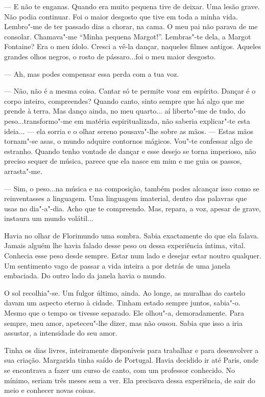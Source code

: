 --- E não te enganas. Quando era muito pequena tive de deixar. Uma lesão
grave. Não podia continuar. Foi o maior desgosto que tive em toda a
minha vida. Lembro"-me de ter passado dias a chorar, na cama. O meu pai
não parava de me consolar. Chamava"-me ``Minha pequena Margot!''.
Lembras"-te dela, a Margot Fontaine? Era o meu ídolo. Cresci a vê-la
dançar, naqueles filmes antigos. Aqueles grandes olhos negros, o rosto
de pássaro...foi o meu maior desgosto.

--- Ah, mas podes compensar essa perda com a tua voz.

--- Não, não é a mesma coisa. Cantar só te permite voar em espírito.
Dançar é o corpo inteiro, compreendes? Quando canto, sinto sempre que há
algo que me prende à terra. Mas danço ainda, no meu quarto... aí
liberto"-me de tudo, do peso...transformo"-me em matéria espiritualizada,
não saberia explicar"-te esta ideia... --- ela sorria e o olhar sereno
pousava"-lhe sobre as mãos. --- Estas mãos tornam"-se asas, o mundo adquire
contornos mágicos. Vou"-te confessar algo de estranho. Quando tenho
vontade de dançar e esse desejo se torna imperioso, não preciso sequer
de música, parece que ela nasce em mim e me guia os passos, arrasta"-me.

--- Sim, o peso...na música e na composição, também podes alcançar isso
como se reinventasses a linguagem. Uma linguagem imaterial, dentro das
palavras que usas no dia"-a"-dia. Acho que te compreendo. Mas, repara, a
voz, apesar de grave, instaura um mundo volátil...

Havia no olhar de Florimundo uma sombra. Sabia exactamente do que ela
falava. Jamais alguém lhe havia falado desse peso ou dessa experiência
íntima, vital. Conhecia esse peso desde sempre. Estar num lado e desejar
estar noutro qualquer. Um sentimento vago de passar a vida inteira a por
detrás de uma janela embaciada. Do outro lado da janela havia o mundo.

O sol recolhia"-se. Um fulgor último, ainda. Ao longe, as muralhas do
castelo davam um aspecto eterno à cidade. Tinham estado sempre juntos,
sabia"-o. Mesmo que o tempo os tivesse separado. Ele olhou"-a,
demoradamente. Para sempre, meu amor, apeteceu"-lhe dizer, mas não ousou.
Sabia que isso a iria assustar, a intensidade do seu amor.

Tinha os dias livres, inteiramente disponíveis para trabalhar e para
desenvolver a sua criação. Margarida tinha saído de Portugal. Havia
decidido ir até Paris, onde se encontrava a fazer um curso de canto, com
um professor conhecido. No mínimo, seriam três meses sem a ver. Ela
precisava dessa experiência, de sair do meio e conhecer novas coisas.

